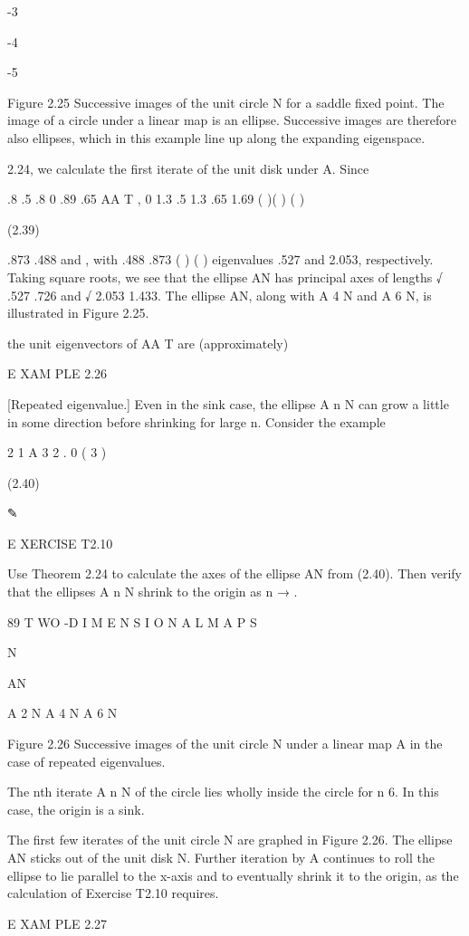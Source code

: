 \documentclass[12pt]{article}
\begin{document}
-3

-4

-5

Figure 2.25 Successive images of the unit circle N for a saddle ﬁxed point. The image of a circle under a linear map is an ellipse. 
Successive images are therefore also ellipses, which in this example line up along the expanding eigenspace.

2.24, we calculate the ﬁrst iterate of the unit disk under A. Since

.8 .5 .8 0 .89 .65 AA T   , 0 1.3 .5 1.3 .65 1.69 ( )( ) ( )

(2.39)

.873 .488 and , with .488 .873 ( ) ( ) eigenvalues .527 and 2.053, respectively. Taking square roots, we see that the ellipse AN has 
principal axes of lengths  √ .527  .726 and  √ 2.053  1.433. The ellipse AN, along with A 4 N and A 6 N, is illustrated in Figure 
2.25.

the unit eigenvectors of AA T are (approximately)

E XAM PLE 2.26

[Repeated eigenvalue.] Even in the sink case, the ellipse A n N can grow a little in some direction before shrinking for large n. 
Consider the example

2 1 A 3 2 . 0 ( 3 )

(2.40)

✎

E XERCISE T2.10

Use Theorem 2.24 to calculate the axes of the ellipse AN from (2.40). Then verify that the ellipses A n N shrink to the origin as n 
→ .

89 T WO -D I M E N S I O N A L M A P S

N

AN

A 2 N A 4 N A 6 N

Figure 2.26 Successive images of the unit circle N under a linear map A in the case of repeated eigenvalues.

The nth iterate A n N of the circle lies wholly inside the circle for n 
 6. In this case, the origin is a sink.

The ﬁrst few iterates of the unit circle N are graphed in Figure 2.26. The ellipse AN sticks out of the unit disk N. Further 
iteration by A continues to roll the ellipse to lie parallel to the x-axis and to eventually shrink it to the origin, as the 
calculation of Exercise T2.10 requires.

E XAM PLE 2.27
\end{document}
